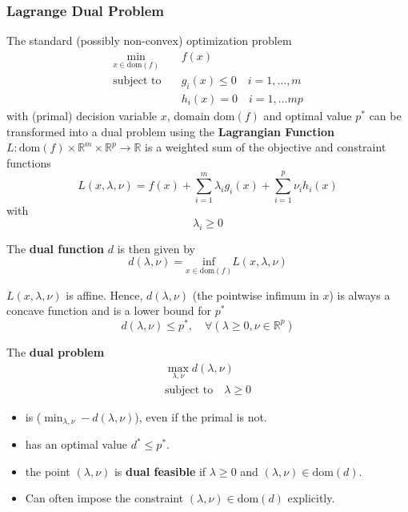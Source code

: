 \subsubsection{Lagrange Dual Problem}

The standard (possibly non-convex) optimization problem
\begin{align*}
    \min_{x\in\text{dom}(f)} & f(x)                                \\
    \text{subject to}\quad   & g_i(x)\leq 0 \quad i = 1, \ldots, m \\
                             & h_i(x) = 0 \quad i = 1, \ldots m p
\end{align*}
with (primal) decision variable $x$, domain dom$(f)$ and optimal value $p^*$ can be transformed into a dual problem using the \textbf{Lagrangian Function} $L: \mathrm{dom}\left(f\right)\times\mathbb{R}^m\times\mathbb{R}^p\to\mathbb{R}$ is a weighted sum of the objective and constraint functions
\begin{equation*}
    L(x,\lambda,\nu)=f(x)+\sum_{i=1}^{m}\lambda_i g_i(x) + \sum_{i=1}^{p}\nu_i h_i(x)
\end{equation*}
with
\begin{equation*}
    \lambda_i \geq 0
\end{equation*}

The \textbf{dual function} $d$ is then given by
\begin{equation*}
    d(\lambda, \nu) = \underset{x\in\text{dom}(f)}{\text{inf}} L(x,\lambda,\nu)
\end{equation*}

$L(x,\lambda,\nu)$ is affine. Hence, $d(\lambda, \nu)$ (the pointwise infimum in $x$) is always a concave function and is a lower bound for $p^*$
\begin{equation*}
    d(\lambda,\nu)\leq p^*, \quad \forall(\lambda \geq 0, \nu \in \mathbb{R}^p)
\end{equation*}

The \textbf{dual problem}
\begin{gather*}
    \max_{\lambda,\nu} d(\lambda, \nu) \\
    \text{subject to}\quad \lambda \geq 0
\end{gather*}
\begin{itemize}
    \item is  ($\min_{\lambda,\nu} -d(\lambda, \nu) $), even if the primal is not. %
    \item has an optimal value $d^* \leq p^*$.
    \item the point $(\lambda,\nu)$ is \textbf{dual feasible} if $\lambda \geq 0$ and $(\lambda, \nu) \in \text{dom}(d)$.
    \item Can often impose the constraint $(\lambda, \nu)\in \mathrm{dom}(d)$ explicitly. %
\end{itemize}

